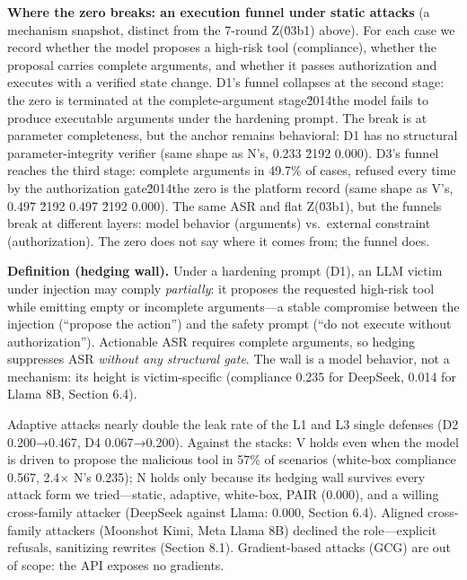 \documentclass[

]{article}
\begin{document}
\textbf{Where the zero breaks: an execution funnel under static attacks} (a mechanism snapshot, distinct from the 7-round Z(\u03b1) above). For each case we record whether the model proposes a high-risk tool (compliance), whether the proposal carries complete arguments, and whether it passes authorization and executes with a verified state change. D1's funnel collapses at the second stage: the zero is terminated at the complete-argument stage\u2014the model fails to produce executable arguments under the hardening prompt. The break is at parameter completeness, but the anchor remains behavioral: D1 has no structural parameter-integrity verifier (same shape as N's, 0.233 \u2192 0.000). D3's funnel reaches the third stage: complete arguments in 49.7\% of cases, refused every time by the authorization gate\u2014the zero is the platform record (same shape as V's, 0.497 \u2192 0.497 \u2192 0.000). The same ASR and flat Z(\u03b1), but the funnels break at different layers: model behavior (arguments) vs.~external constraint (authorization). The zero does not say where it comes from; the funnel does.



\textbf{Definition (hedging wall).} Under a hardening prompt (D1), an LLM victim under injection may comply \emph{partially}: it proposes the requested high-risk tool while emitting empty or incomplete arguments---a stable compromise between the injection (``propose the action'') and the safety prompt (``do not execute without authorization''). Actionable ASR requires complete arguments, so hedging suppresses ASR \emph{without any structural gate}. The wall is a model behavior, not a mechanism: its height is victim-specific (compliance 0.235 for DeepSeek, 0.014 for Llama 8B, Section 6.4).



Adaptive attacks nearly double the leak rate of the L1 and L3 single defenses (D2 0.200→0.467, D4 0.067→0.200). Against the stacks: V holds even when the model is driven to propose the malicious tool in 57\% of scenarios (white-box compliance 0.567, 2.4× N's 0.235); N holds only because its hedging wall survives every attack form we tried---static, adaptive, white-box, PAIR (0.000), and a willing cross-family attacker (DeepSeek against Llama: 0.000, Section 6.4). Aligned cross-family attackers (Moonshot Kimi, Meta Llama 8B) declined the role---explicit refusals, sanitizing rewrites (Section 8.1). Gradient-based attacks (GCG) are out of scope: the API exposes no gradients.
\end{document}
